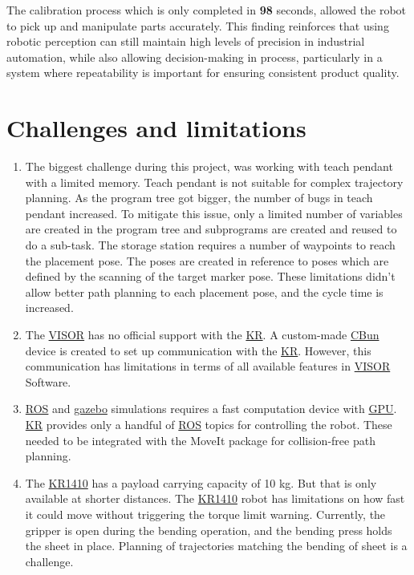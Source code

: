 The calibration process which is only completed in \textbf{98} seconds, allowed the robot to pick up and manipulate parts accurately. This finding reinforces that using robotic perception can still maintain high levels of precision in industrial automation, while also allowing decision-making in process, particularly in a system where repeatability is important for ensuring consistent product quality.

\section{Challenges and limitations}
\begin{enumerate}
    \item The biggest challenge during this project, was working with teach pendant with a limited memory. Teach pendant is not suitable for complex trajectory planning. As the program tree got bigger, the number of bugs in teach pendant increased. To mitigate this issue, only a limited number of variables are created in the program tree and subprograms are created and reused to do a sub-task. The storage station requires a number of waypoints to reach the placement pose. The poses are created in reference to poses which are defined by the scanning of the target marker pose. These limitations didn't allow better path planning to each placement pose, and the cycle time is increased.
    \item The \hyperref[acro:VISOR]{VISOR}\textsuperscript{\textregistered} has no official support with the \hyperref[acro:KR]{KR}. A custom-made \hyperref[acro:CBun]{CBun} device is created to set up communication with the \hyperref[acro:KR]{KR}. However, this communication has limitations in terms of all available features in \hyperref[acro:VISOR]{VISOR}\textsuperscript{\textregistered} Software.
    \item \hyperref[acro:ROS]{ROS} and \hyperref[acro:Gazebo]{gazebo} simulations requires a fast computation device with \hyperref[acro:GPU]{GPU}. \hyperref[acro:KR]{KR} provides only a handful of \hyperref[acro:ROS]{ROS} topics for controlling the robot. These needed to be integrated with the MoveIt package for collision-free path planning.
    \item The \hyperref[acro:KR]{KR1410} has a payload carrying capacity of 10 kg. But that is only available at shorter distances. The \hyperref[acro:KR]{KR1410} robot has limitations on how fast it could move without triggering the torque limit warning. Currently, the gripper is open during the bending operation, and the bending press holds the sheet in place. Planning of trajectories matching the bending of sheet is a challenge.
\end{enumerate}

